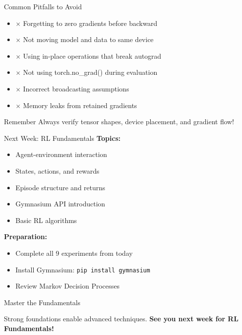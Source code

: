 \documentclass[aspectratio=169,10pt]{beamer}
\begin{document}
\begin{frame}{Common Pitfalls to Avoid}
\begin{itemize}
    \item $\times$ Forgetting to zero gradients before backward
    \item $\times$ Not moving model and data to same device
    \item $\times$ Using in-place operations that break autograd
    \item $\times$ Not using torch.no\_grad() during evaluation
    \item $\times$ Incorrect broadcasting assumptions
    \item $\times$ Memory leaks from retained gradients
\end{itemize}

\begin{block}{Remember}
Always verify tensor shapes, device placement, and gradient flow!
\end{block}
\end{frame}

\begin{frame}{Next Week: RL Fundamentals}
\textbf{Topics:}
\begin{itemize}
    \item Agent-environment interaction
    \item States, actions, and rewards
    \item Episode structure and returns
    \item Gymnasium API introduction
    \item Basic RL algorithms
\end{itemize}

\textbf{Preparation:}
\begin{itemize}
    \item Complete all 9 experiments from today
    \item Install Gymnasium: \texttt{pip install gymnasium}
    \item Review Markov Decision Processes
\end{itemize}
\end{frame}

\begin{frame}{Master the Fundamentals}
\begin{center}
\Large{Strong foundations enable advanced techniques.}
\vfill
\textbf{See you next week for RL Fundamentals!}
\end{center}
\end{frame}
\end{document}
